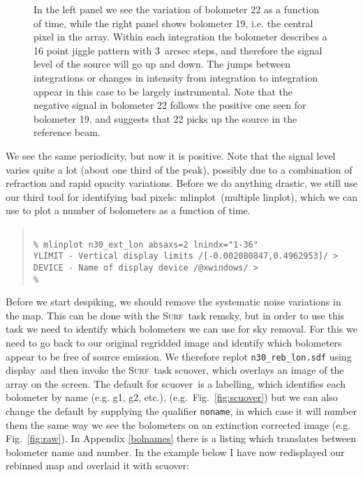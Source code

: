 \documentclass[twoside,11pt]{article}
\newenvironment{myquote}{\begin{quote}\begin{small}}{\end{small}\end{quote}}
\newcommand{\surf}{\xref{\textsc{Surf}}{sun216}{}}
\newcommand{\task}[1]{\textsf{#1}}
\newcommand{\param}[1]{\texttt{#1}}
\newcommand{\remsky}{\xref{\task{remsky}}{sun216}{REMSKY}}
\newcommand{\scuover}{\xref{\task{scuover}}{sun216}{SCUOVER}}
\newcommand{\display}{\xref{\task{display}}{sun95}{DISPLAY}}
\newcommand{\linplot}{\xref{\task{linplot}}{sun95}{LINPLOT}}
\newcommand{\mlinplot}{\xref{\task{mlinplot}}{sun95}{MLINPLOT}}
\newcommand{\xref}[3]{#1}
\begin{document}

\begin{figure}
\begin{center}
\caption{In the left panel we see the variation of
bolometer 22 as a function of time, while the right panel shows
bolometer 19, i.e. the central pixel in the array. Within each
integration the bolometer describes a 16 point jiggle pattern with 3~arcsec
steps, and therefore the signal level of the source will go up and
down.  The jumps between integrations or changes in intensity from
integration to integration appear in this case to be largely
instrumental. Note that the negative signal in bolometer 22 follows the
positive one seen for bolometer 19, and suggests that 22 picks up the
source in the reference beam. }
\label{fig:lineplots}
\end{center}
\end{figure}



We see the same periodicity, but now it is positive. Note that the signal
level varies quite a lot (about one third of the peak), possibly due to
a combination of refraction and rapid opacity variations. Before we do
anything drastic, we still use our third tool for identifying bad pixels:
\mlinplot\ (multiple \linplot), which we can use to plot a number of
bolometers as a function of time.

\begin{myquote} \begin{verbatim}

% mlinplot n30_ext_lon absaxs=2 lnindx="1-36"
YLIMIT - Vertical display limits /[-0.002080847,0.4962953]/ > 
DEVICE - Name of display device /@xwindows/ >
% 
\end{verbatim} \end{myquote}


Before we start despiking, we should remove the systematic noise variations in
the map. This can be done with the \surf\ task \remsky, but in order to use
this task we need to identify which bolometers we can use for sky removal. For
this we need to go back to our original regridded image and identify which
bolometers appear to be free of source emission. We therefore replot
\texttt{n30\_reb\_lon.sdf} using \display\ and then invoke the \surf\ task
\scuover, which overlays an image of the array on the screen. The default for
\scuover\ is a labelling, which identifies each bolometer by name (e.g. g1,
g2, etc.), (e.g.\ Fig.\ \ref{fig:scuover}) but we can also change the default
by supplying the qualifier \param{noname}, in which case it will number them the
same way we see the bolometers on an extinction corrected image (e.g. Fig.\
\ref{fig:raw}). In Appendix \ref{bolnames} there is a listing which translates
between bolometer name and number. In the example below I have now redisplayed
our rebinned map and overlaid it with \scuover:
\end{document}
